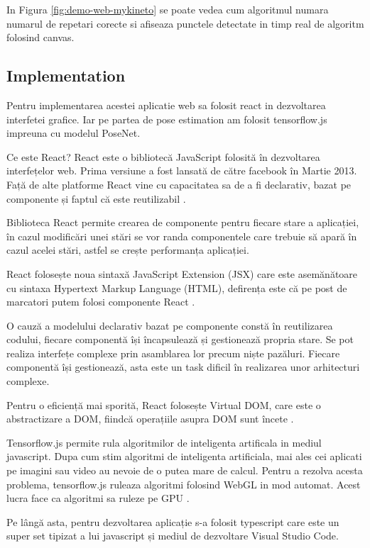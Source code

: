 In Figura \ref{fig:demo-web-mykineto} se poate vedea cum algoritmul numara numarul de repetari corecte si
afiseaza punctele detectate in timp real de algoritm folosind canvas.




\subsection{Implementation}

Pentru implementarea acestei aplicatie web sa folosit react in dezvoltarea interfetei grafice.
Iar pe partea de pose estimation am folosit tensorflow.js impreuna cu modelul PoseNet.

Ce este React? React este o bibliotecă JavaScript folosită în dezvoltarea interfețelor web.
Prima versiune a fost lansată de către facebook în Martie 2013. Față de alte platforme React vine cu
capacitatea sa de a fi declarativ, bazat pe componente și faptul că este reutilizabil \cite{fb-react}.

Biblioteca React permite crearea de componente pentru fiecare stare a aplicației, în cazul
modificări unei stări se vor randa componentele care trebuie să apară în cazul acelei stări, astfel se
crește performanța aplicației.

React folosește noua sintaxă JavaScript Extension (JSX) care este asemănătoare cu sintaxa
Hypertext Markup Language (HTML), defirența este că pe post de marcatori putem folosi
componente React \cite{jsx-react}.

O cauză a modelului declarativ bazat pe componente constă în reutilizarea codului, fiecare
componentă își încapsulează și gestionează propria stare. Se pot realiza interfețe complexe prin
asamblarea lor precum niște pazăluri. Fiecare componentă își gestionează, asta este un task dificil în
realizarea unor arhitecturi complexe.

Pentru o eficiență mai sporită, React folosește Virtual DOM, care este o abstractizare a
DOM, fiindcă operațiile asupra DOM sunt încete \cite{virtual-dom-react}.

Tensorflow.js permite rula algoritmilor de inteligenta artificala in mediul javascript.
Dupa cum stim algoritmi de inteligenta artificiala, mai ales cei aplicati pe imagini sau video au nevoie
de o putea mare de calcul.
Pentru a rezolva acesta problema, tensorflow.js ruleaza algoritmi folosind WebGL in mod automat.
Acest lucra face ca algoritmi sa ruleze pe GPU \cite{tensorflow.js}.


Pe lângă asta, pentru dezvoltarea aplicație s-a folosit typescript care este un super set tipizat a lui javascript și mediul de dezvoltare Visual Studio Code.

